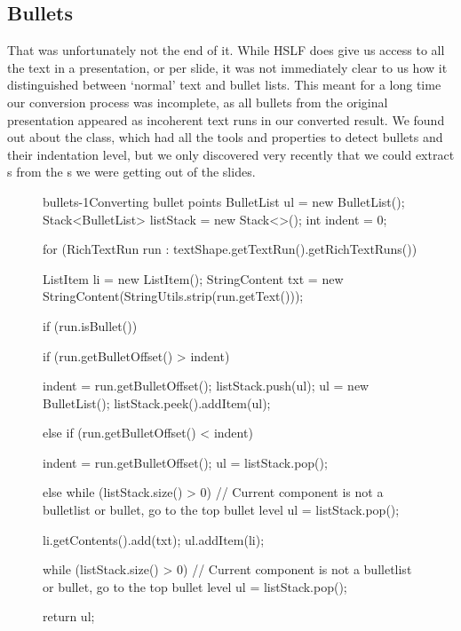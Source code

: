    \subsection{Bullets}

    That was unfortunately not the end of it. While HSLF does give us access to
    all the text in a presentation, or per slide, it was not immediately clear
    to us how it distinguished between `normal' text and bullet lists. This
    meant for a long time our conversion process was incomplete, as all bullets
    from the original \ppt presentation appeared as incoherent text runs in our
    converted result. We found out about the  class, which
    had all the tools and properties to detect bullets and their indentation
    level, but we only discovered very recently that we could extract
    s from the s we were getting out of the
    slides.

     \begin{figure}[h!]
      \begin{lstjava}{bullets-1}{Converting bullet points}
BulletList ul = new BulletList();
Stack<BulletList> listStack = new Stack<>();
int indent = 0;

for (RichTextRun run : textShape.getTextRun().getRichTextRuns()) {
  ListItem li = new ListItem();
  StringContent txt = new StringContent(StringUtils.strip(run.getText()));

  if (run.isBullet()) {
    if (run.getBulletOffset() > indent) {

      indent = run.getBulletOffset();
      listStack.push(ul);
      ul = new BulletList();
      listStack.peek().addItem(ul);

    } else if (run.getBulletOffset() < indent) {

      indent = run.getBulletOffset();
      ul = listStack.pop();

    }
  } else {
    while (listStack.size() > 0) {
//  Current component is not a bulletlist or bullet, go to the top bullet level
      ul = listStack.pop();
    }
  }

  li.getContents().add(txt);
  ul.addItem(li);
}

while (listStack.size() > 0) {
  // Current component is not a bulletlist or bullet, go to the top bullet level
  ul = listStack.pop();
}

return ul;
      \end{lstjava}
     \end{figure}

